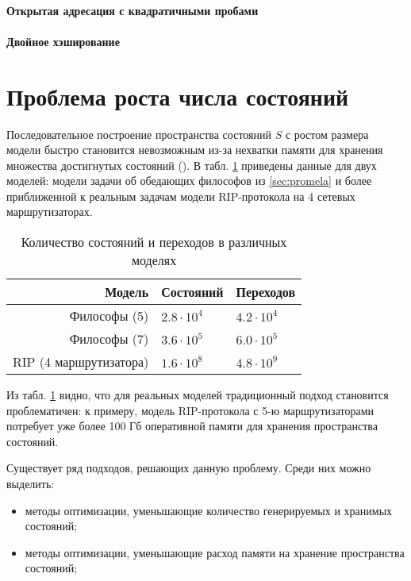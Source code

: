 \paragraph{Открытая адресация с квадратичными пробами}
\label{sec:open-quadratic-probing}

\paragraph{Двойное хэширование}
\label{sec:open-double-hashing}

\section{Проблема роста числа состояний}
\label{sec:state-explosion}

Последовательное построение пространства состояний $S$ с ростом размера модели
быстро становится невозможным из-за нехватки памяти для хранения множества
достигнутых состояний (). В табл. \ref{tab:models-statecount}
приведены данные для двух моделей: модели задачи об обедающих философов из
\ref{sec:promela} и более приближенной к реальным задачам модели RIP-протокола
на 4 сетевых маршрутизаторах.

\begin{table}
  \centering
  \begin{tabular}{|r|l|l|}
    \hline
    Модель                  & Состояний         & Переходов       \\
    \hline
    Философы (5)            & $2.8 \cdot 10^4$  & $4.2 \cdot 10^4$ \\
    Философы (7)            & $3.6 \cdot 10^5$  & $6.0 \cdot 10^5$ \\
    RIP (4 маршрутизатора)  & $1.6 \cdot 10^8$  & $4.8 \cdot 10^9$ \\
    \hline
  \end{tabular}
  \caption{Количество состояний и переходов в различных моделях}
\label{tab:models-statecount}
\end{table}

Из табл. \ref{tab:models-statecount} видно, что для реальных моделей традиционный подход
становится проблематичен: к примеру, модель RIP-протокола с 5-ю маршрутизаторами потребует
уже более 100 Гб оперативной памяти для хранения пространства состояний.

Существует ряд подходов, решающих данную проблему. Среди них можно выделить:

\begin{itemize}
\item методы оптимизации, уменьшающие количество генерируемых и хранимых состояний;
\item методы оптимизации, уменьшающие расход памяти на хранение пространства состояний;
\end{itemize}

